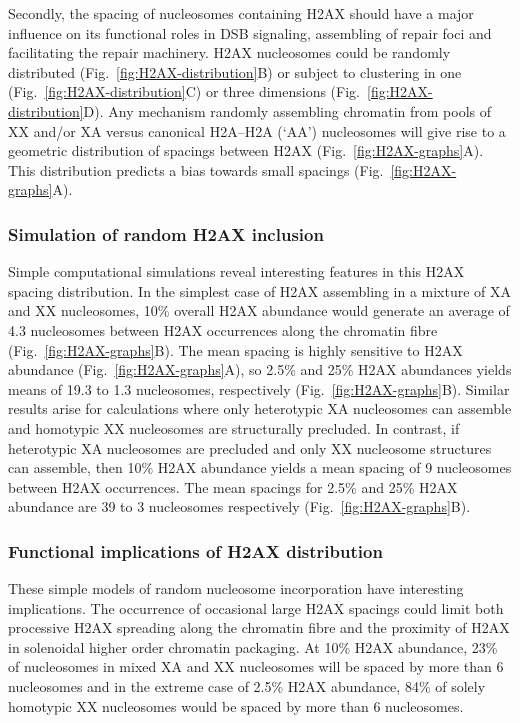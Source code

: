 \documentclass[graybox]{svmult}
\begin{document}
Secondly, the spacing of nucleosomes containing H2AX should have a major influence on its functional
roles in DSB signaling, assembling of repair foci and facilitating the repair machinery. H2AX
nucleosomes could be randomly distributed (Fig.~\ref{fig:H2AX-distribution}B) or subject to clustering
in one (Fig.~\ref{fig:H2AX-distribution}C) or three dimensions (Fig.~\ref{fig:H2AX-distribution}D). Any
mechanism randomly assembling chromatin from pools of XX and/or XA versus canonical H2A--H2A (`AA')
nucleosomes will give rise to a geometric distribution of spacings between H2AX (Fig.~\ref{fig:H2AX-graphs}A).
This distribution predicts a bias towards small spacings (Fig.~\ref{fig:H2AX-graphs}A).

\subsubsection{Simulation of random H2AX inclusion}
\label{subsubsec:Simulation-random}
Simple computational simulations reveal interesting features in this H2AX spacing distribution. In
the simplest case of H2AX assembling in a mixture of XA and XX nucleosomes, 10\% overall H2AX
abundance would generate an average of 4.3 nucleosomes between H2AX occurrences along the chromatin
fibre (Fig.~\ref{fig:H2AX-graphs}B). The mean spacing is highly sensitive to H2AX abundance
(Fig.~\ref{fig:H2AX-graphs}A), so 2.5\% and 25\% H2AX abundances yields means of 19.3 to 1.3
nucleosomes, respectively (Fig.~\ref{fig:H2AX-graphs}B). Similar results arise for calculations
where only heterotypic XA nucleosomes can assemble and homotypic XX nucleosomes are structurally
precluded. In contrast, if heterotypic XA nucleosomes are precluded and only XX nucleosome
structures can assemble, then 10\% H2AX abundance yields a mean spacing of 9 nucleosomes between
H2AX occurrences. The mean spacings for 2.5\% and 25\% H2AX abundance are 39 to 3 nucleosomes
respectively (Fig.~\ref{fig:H2AX-graphs}B).

\subsubsection{Functional implications of H2AX distribution}
\label{subsubsec:Functional-impliactions}
These simple models of random nucleosome incorporation have interesting implications. The occurrence
of occasional large H2AX spacings could limit both processive \ugamma H2AX spreading along the
chromatin fibre and the proximity of H2AX in solenoidal higher order chromatin packaging. At 10\% H2AX
abundance, 23\% of nucleosomes in mixed XA and XX nucleosomes will be spaced by more than 6 nucleosomes
and in the extreme case of 2.5\% H2AX abundance, 84\% of solely homotypic XX nucleosomes would be
spaced by more than 6 nucleosomes.
\end{document}
